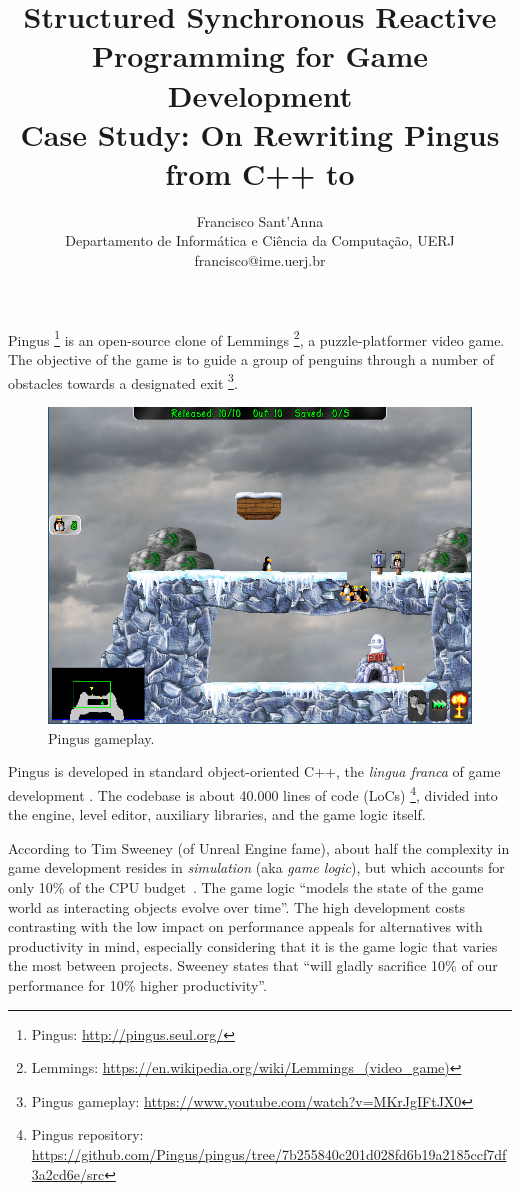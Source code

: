 \documentclass{vgtc}                          %
\title{Structured Synchronous Reactive Programming for Game Development
        \\ \Large{Case Study: On Rewriting Pingus from C++ to \CEU}}
\author{Francisco Sant'Anna
        \\ Departamento de Inform\'atica e Ci\^encia da Computa\c{c}\~ao, UERJ
        \\ francisco@ime.uerj.br}
\begin{document}

\maketitle

Pingus%
\footnote{Pingus: \url{http://pingus.seul.org/}}
is an open-source clone of Lemmings%
\footnote{Lemmings: \url{https://en.wikipedia.org/wiki/Lemmings_(video_game)}},
a puzzle-platformer video game.      
The objective of the game is to guide a group of penguins through a number of
obstacles towards a designated exit%
\footnote{Pingus gameplay: \url{https://www.youtube.com/watch?v=MKrJgIFtJX0}}.

\begin{figure}[t]
\centering
\includegraphics[width=\columnwidth]{pingus}
\caption{Pingus gameplay.
\label{fig.sweeney}
}
\end{figure}

Pingus is developed in standard object-oriented C++, the \emph{lingua franca}
of game development \cite{games.patterns}.
The codebase is about 40.000 lines of code (LoCs)%
\footnote{Pingus repository: \url{https://github.com/Pingus/pingus/tree/7b255840c201d028fd6b19a2185ccf7df3a2cd6e/src}}, divided into
the engine, level editor, auxiliary libraries, and the game logic itself.

According to Tim Sweeney (of Unreal Engine fame), about half the complexity in
game development resides in \emph{simulation} (aka \emph{game logic}), but
which accounts for only 10\% of the CPU budget~\cite{games.sweeney}.
The game logic ``models the state of the game world as interacting objects
evolve over time''.
The high development costs contrasting with the low impact on performance
appeals for alternatives with productivity in mind, especially considering that
it is the game logic that varies the most between projects.
Sweeney states that ``will gladly sacrifice 10\% of our performance for 10\%
higher productivity''.
\end{document}

